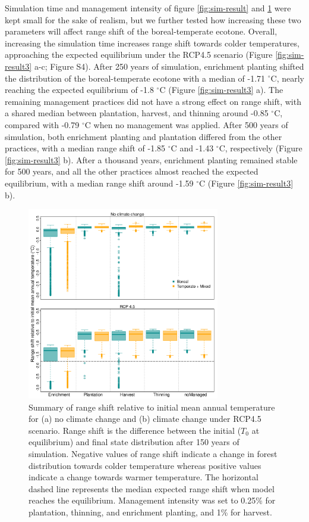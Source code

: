 \documentclass[12pt]{article}
\begin{document}
Simulation time and management intensity of figure \ref{fig:sim-result}
and \ref{fig:sim-result2} were kept small for the sake of realism, but
we further tested how increasing these two parameters will affect range
shift of the boreal-temperate ecotone. Overall, increasing the
simulation time increases range shift towards colder temperatures,
approaching the expected equilibrium under the RCP4.5 scenario (Figure
\ref{fig:sim-result3} a-c; Figure S4). After 250 years of simulation,
enrichment planting shifted the distribution of the boreal-temperate
ecotone with a median of -1.71 \(^{\circ}\)C, nearly reaching the
expected equilibrium of -1.8 \(^{\circ}\)C (Figure \ref{fig:sim-result3}
a). The remaining management practices did not have a strong effect on
range shift, with a shared median between plantation, harvest, and
thinning around -0.85 \(^{\circ}\)C, compared with -0.79 \(^{\circ}\)C
when no management was applied. After 500 years of simulation, both
enrichment planting and plantation differed from the other practices,
with a median range shift of -1.85 \(^{\circ}\)C and -1.43
\(^{\circ}\)C, respectively (Figure \ref{fig:sim-result3} b). After a
thousand years, enrichment planting remained stable for 500 years, and
all the other practices almost reached the expected equilibrium, with a
median range shift around -1.59 \(^{\circ}\)C (Figure
\ref{fig:sim-result3} b).

\begin{figure}
\hypertarget{fig:sim-result2}{%
\centering
\includegraphics[width=0.75\textwidth,height=\textheight]{manuscript/img/sim-result_3.png}
\caption{Summary of range shift relative to initial mean annual
temperature for (a) no climate change and (b) climate change under
RCP4.5 scenario. Range shift is the difference between the initial
(\(T_0\) at equilibrium) and final state distribution after 150 years of
simulation. Negative values of range shift indicate a change in forest
distribution towards colder temperature whereas positive values indicate
a change towards warmer temperature. The horizontal dashed line
represents the median expected range shift when model reaches the
equilibrium. Management intensity was set to 0.25\% for plantation,
thinning, and enrichment planting, and 1\% for
harvest.}\label{fig:sim-result2}
}
\end{figure}
\end{document}
